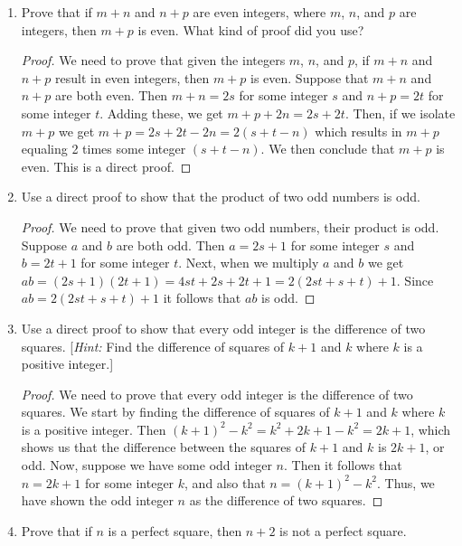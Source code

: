 \documentclass[11pt]{article}
\begin{document}
\begin{enumerate}[label=\textbf{\arabic*.}]
	\item Prove that if $m + n$ and $n + p$ are even integers, where $m$, $n$, and $p$ are integers, then $m + p$ is even. What kind of proof did you use?
	
	\begin{proof}
		We need to prove that given the integers $m$, $n$, and $p$, if $m + n$ and $n + p$ result in even integers, then $m + p$ is even. Suppose that $m + n$ and $n + p$ are both even. Then $m + n = 2s$ for some integer $s$ and $n + p = 2t$ for some integer $t$. Adding these, we get $m + p + 2n = 2s + 2t$. Then, if we isolate $m + p$ we get $m + p = 2s + 2t - 2n = 2(s + t - n)$ which results in $m + p$ equaling 2 times some integer $(s + t - n)$. We then conclude that $m + p$ is even. This is a direct proof.
	\end{proof}

	\item Use a direct proof to show that the product of two odd numbers is odd.
	
	\begin{proof}
		We need to prove that given two odd numbers, their product is odd. Suppose $a$ and $b$ are both odd. Then $a = 2s + 1$ for some integer $s$ and $b = 2t + 1$ for some integer $t$. Next, when we multiply $a$ and $b$ we get $ab = (2s + 1)(2t + 1) = 4st + 2s + 2t + 1 = 2(2st + s + t) + 1$. Since $ab =  2(2st + s + t) + 1$ it follows that $ab$ is odd.
	\end{proof}

	\item Use a direct proof to show that every odd integer is the difference of two squares. [\emph{Hint:} Find the difference of squares of $k + 1$ and $k$ where $k$ is a positive integer.]
	
	\begin{proof}
		We need to prove that every odd integer is the difference of two squares. We start by finding the difference of squares of $k + 1$ and $k$ where $k$ is a positive integer. Then $(k + 1)^2 - k^2 = k^2 + 2k + 1 - k^2 = 2k + 1$, which shows us that the difference between the squares of $k + 1$ and $k$ is $2k + 1$, or odd. Now, suppose we have some odd integer $n$. Then it follows that $n = 2k + 1$ for some integer $k$, and also that $n = (k + 1)^2 - k^2$. Thus, we have shown the odd integer $n$ as the difference of two squares.
	\end{proof}

	\item Prove that if $n$ is a perfect square, then $n + 2$ is not a perfect square.
	

\end{enumerate}
\end{document}
